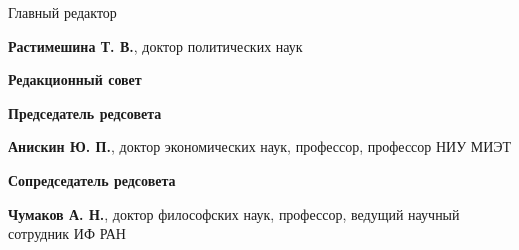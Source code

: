 


\vspace*{-2em}
\begin{center}
    \small
    Главный редактор

    \textbf{Растимешина Т. В.}, {доктор политических наук}
\end{center}

\noindent
\begin{minipage}[t]{.48\textwidth}
    \begin{flushleft}
        \footnotesize

\begin{center}
    \textbf{Редакционный совет}
\end{center}


\textbf{Председатель редсовета}

\textbf{Анискин Ю. П.}, доктор экономических наук,
профессор, профессор НИУ МИЭТ

\vspace{1em}
\textbf{Сопредседатель редсовета}

\textbf{Чумаков А. Н.}, доктор философских наук, профессор,
ведущий научный сотрудник ИФ РАН



\end{flushleft}
\end{minipage}
